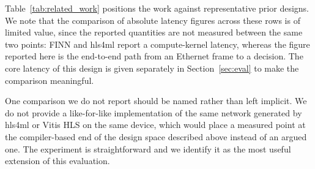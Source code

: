 \documentclass[final,5p,times,twocolumn]{elsarticle}
\begin{document}
Table~\ref{tab:related_work} positions the work against representative prior
designs. We note that the comparison of absolute latency figures across these
rows is of limited value, since the reported quantities are not measured between
the same two points: FINN and hls4ml report a compute-kernel latency, whereas the
figure reported here is the end-to-end path from an Ethernet frame to a decision.
The core latency of this design is given separately in
Section~\ref{sec:eval} to make the comparison meaningful.

One comparison we do not report should be named rather than left implicit. We do
not provide a like-for-like implementation of the same network generated by
hls4ml or Vitis HLS on the same device, which would place a measured point at the
compiler-based end of the design space described above instead of an argued one.
The experiment is straightforward and we identify it as the most useful extension
of this evaluation.
\end{document}
